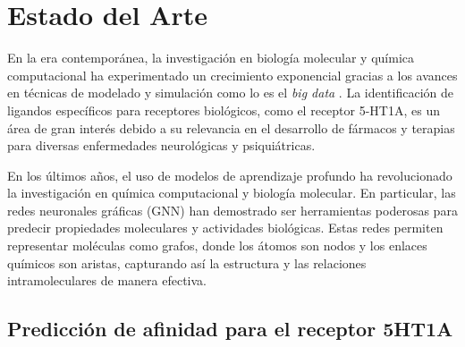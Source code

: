 
%


\section{Estado del Arte}
\label{sec:state_of_the_art}

En la era contemporánea, la investigación en biología molecular y química computacional ha experimentado un crecimiento exponencial gracias a los avances en técnicas de modelado y simulación como lo es el \textit{big data }. La identificación de ligandos específicos para receptores biológicos, como el receptor 5-HT1A, es un área de gran interés debido a su relevancia en el desarrollo de fármacos y terapias para diversas enfermedades neurológicas y psiquiátricas. 


En los últimos años, el uso de modelos de aprendizaje profundo ha revolucionado la investigación en química computacional y biología molecular. En particular, las redes neuronales gráficas (GNN) han demostrado ser herramientas poderosas para predecir propiedades moleculares y actividades biológicas. Estas redes permiten representar moléculas como grafos, donde los átomos son nodos y los enlaces químicos son aristas, capturando así la estructura y las relaciones intramoleculares de manera efectiva.


\subsection{Predicción de afinidad para el receptor 5HT1A}
\label{ssec:arte_5ht1a}


